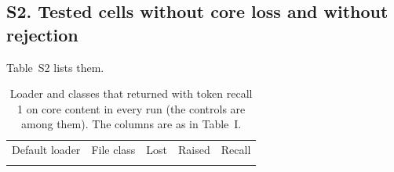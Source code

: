 \subsection*{S2. Tested cells without core loss and without rejection}
Table~S2 lists them.
\begin{table}[H]
\caption{Loader and classes that returned with token recall 1 on core content in every run (the controls are among them). The columns are as in Table~I.\label{tab:clean}}
\footnotesize
\begin{ruledtabular}
\begin{tabular}{llccc}
Default loader & File class & Lost & Raised & Recall \\
\colrule

\end{tabular}
\end{ruledtabular}
\end{table}

